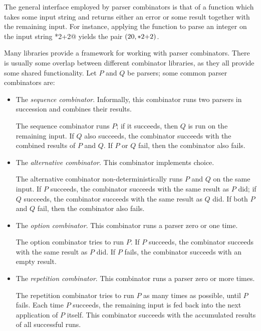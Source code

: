 \documentclass[UdineBachThesis,american,11pt]{PhdThesis}
\begin{document}
  The general interface employed by parser combinators is that of a function
  which takes some input string and returns either an error or some result
  together with the remaining input. For instance, applying the function to
  parse an integer on the input string *2+2@ yields the pair
  $\left(20, \text{\lstinline@*2+2@}\right)$.

  Many libraries provide a framework for working with parser combinators. There
  is usually some overlap between different combinator libraries, as they all
  provide some shared functionality. Let $P$ and $Q$ be parsers; some common
  parser combinators are:

  \begin{itemize}
    \item The \emph{sequence combinator}. Informally, this combinator runs two
    parsers in succession and combines their results.

    The sequence combinator runs $P$; if it succeeds, then $Q$ is run on the
    remaining input. If $Q$ also succeeds, the combinator succeeds with the
    combined results of $P$ and $Q$\@. If $P$ or $Q$ fail, then the combinator
    also fails.

    \item The \emph{alternative combinator}. This combinator implements choice.

    The alternative combinator non-deterministically runs $P$ and $Q$ on the
    same input. If $P$ succeeds, the combinator succeeds with the same result as
    $P$ did; if $Q$ succeeds, the combinator succeeds with the same result as
    $Q$ did. If both $P$ and $Q$ fail, then the combinator also fails.

    \item The \emph{option combinator}. This combinator runs a parser zero or
    one time.

    The option combinator tries to run $P$\@. If $P$ succeeds, the combinator
    succeeds with the same result as $P$ did. If $P$ fails, the combinator
    succeeds with an empty result.

    \item The \emph{repetition combinator}. This combinator runs a parser zero
    or more times.

    The repetition combinator tries to run $P$ as many times as possible, until
    $P$ fails. Each time $P$ succeeds, the remaining input is fed back into the
    next application of $P$ itself. This combinator succeeds with the
    accumulated results of all successful runs.
  \end{itemize}
\end{document}
